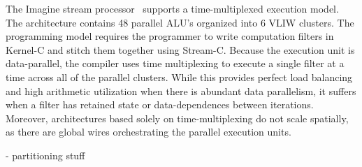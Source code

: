 
The Imagine stream processor~\cite{rixner98bandwidthefficient}
supports a time-multiplexed execution model.  The architecture
contains 48 parallel ALU's organized into 6 VLIW clusters.  The
programming model requires the programmer to write computation filters
in Kernel-C and stitch them together using Stream-C.  Because the
execution unit is data-parallel, the compiler uses time multiplexing
to execute a single filter at a time across all of the parallel
clusters.  While this provides perfect load balancing and high
arithmetic utilization when there is abundant data parallelism, it
suffers when a filter has retained state or data-dependences between
iterations.  Moreover, architectures based solely on
time-multiplexing do not scale spatially, as there are global wires
orchestrating the parallel execution units. 

- partitioning stuff
